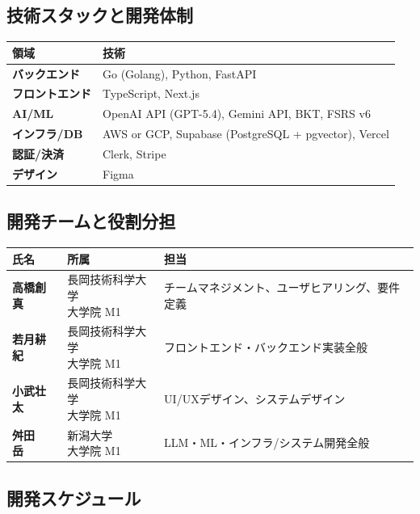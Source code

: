 \documentclass[paper=a4,fontsize=10.5bp,jafontsize=10.5bp,twocolumn]{jlreq}
\begin{document}
\subsection{技術スタックと開発体制}

\begin{footnotesize}\noindent
\begin{tabularx}{\linewidth}{>{\bfseries}l X}
\toprule
領域 & 技術 \\
\midrule
バックエンド & Go (Golang), Python, FastAPI \\
フロントエンド & TypeScript, Next.js \\
AI/ML & OpenAI API (GPT-5.4), Gemini API, BKT, FSRS v6 \\
インフラ/DB & AWS or GCP, Supabase (PostgreSQL + pgvector), Vercel \\
認証/決済 & Clerk, Stripe \\
デザイン & Figma \\
\bottomrule
\end{tabularx}
\end{footnotesize}

\subsection{開発チームと役割分担}

\begin{footnotesize}\noindent
\begin{tabularx}{\linewidth}{>{\bfseries}l l X}
\toprule
氏名 & 所属 & 担当 \\
\midrule
高橋創真 & \parbox[t]{3cm}{長岡技術科学大学\\大学院 M1} & チームマネジメント、ユーザヒアリング、要件定義 \\[4pt]
若月耕紀 & \parbox[t]{3cm}{長岡技術科学大学\\大学院 M1} & フロントエンド・バックエンド実装全般 \\[4pt]
小武壮太 & \parbox[t]{3cm}{長岡技術科学大学\\大学院 M1} & UI/UXデザイン、システムデザイン \\[4pt]
舛田　岳 & \parbox[t]{3cm}{新潟大学\\大学院 M1} & LLM・ML・インフラ/システム開発全般 \\
\bottomrule
\end{tabularx}
\end{footnotesize}

\subsection{開発スケジュール}
\end{document}
